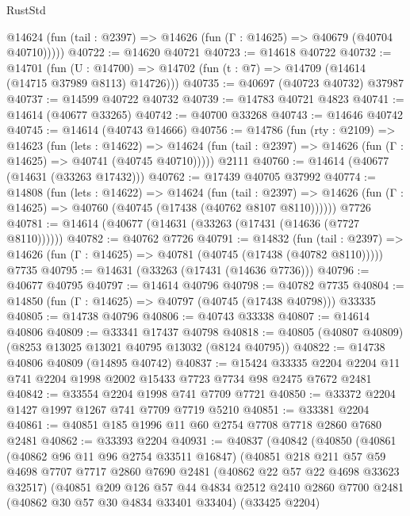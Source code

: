 \begin{lexlean}{RustStd}
\begin{coremodule}
      @14624 (fun (tail : @2397) => @14626 (fun (Γ : @14625) => @40679 (@40704 @40710)))))
@40722 := @14620 @40721
@40723 := @14618 @40722
@40732 := @14701
    (fun (U : @14700) => @14702 (fun (t : @7) => @14709 (@14614 (@14715 @37989 @8113) @14726)))
@40735 := @40697 (@40723 @40732) @37987
@40737 := @14599 @40722 @40732
@40739 := @14783 @40721 @4823
@40741 := @14614 (@40677 @33265)
@40742 := @40700 @33268
@40743 := @14646 @40742
@40745 := @14614 (@40743 @14666)
@40756 := @14786
    (fun (rty : @2109) =>
    @14623
      (fun (lets : @14622) =>
      @14624 (fun (tail : @2397) => @14626 (fun (Γ : @14625) => @40741 (@40745 @40710)))))
    @2111
@40760 := @14614 (@40677 (@14631 (@33263 @17432)))
@40762 := @17439 @40705 @37992
@40774 := @14808
    (fun (lets : @14622) =>
    @14624
      (fun (tail : @2397) =>
      @14626 (fun (Γ : @14625) => @40760 (@40745 (@17438 (@40762 @8107 @8110))))))
    @7726
@40781 := @14614 (@40677 (@14631 (@33263 (@17431 (@14636 (@7727 @8110))))))
@40782 := @40762 @7726
@40791 := @14832
    (fun (tail : @2397) => @14626 (fun (Γ : @14625) => @40781 (@40745 (@17438 (@40782 @8110)))))
    @7735
@40795 := @14631 (@33263 (@17431 (@14636 @7736)))
@40796 := @40677 @40795
@40797 := @14614 @40796
@40798 := @40782 @7735
@40804 := @14850 (fun (Γ : @14625) => @40797 (@40745 (@17438 @40798))) @33335
@40805 := @14738 @40796
@40806 := @40743 @33338
@40807 := @14614 @40806
@40809 := @33341 @17437 @40798
@40818 := @40805 (@40807 @40809) (@8253 @13025 @13021 @40795 @13032 (@8124 @40795))
@40822 := @14738 @40806 @40809 (@14895 @40742)
@40837 := @15424
    @33335
    @2204
    @2204
    @11
    @741
    @2204
    @1998
    @2002
    @15433
    @7723
    @7734
    @98
    @2475
    @7672
    @2481
@40842 := @33554 @2204 @1998 @741 @7709 @7721
@40850 := @33372 @2204 @1427 @1997 @1267 @741 @7709 @7719 @5210
@40851 := @33381 @2204
@40861 := @40851 @185 @1996 @11 @60 @2754 @7708 @7718 @2860 @7680 @2481
@40862 := @33393 @2204
@40931 := @40837
    (@40842
      (@40850
        (@40861
          (@40862 @96 @11 @96 @2754 @33511 @16847)
          (@40851
            @218
            @211
            @57
            @59
            @4698
            @7707
            @7717
            @2860
            @7690
            @2481
            (@40862 @22 @57 @22 @4698 @33623 @32517)
            (@40851
              @209
              @126
              @57
              @44
              @4834
              @2512
              @2410
              @2860
              @7700
              @2481
              (@40862 @30 @57 @30 @4834 @33401 @33404)
              (@33425 @2204)

\end{coremodule}
\end{lexlean}

